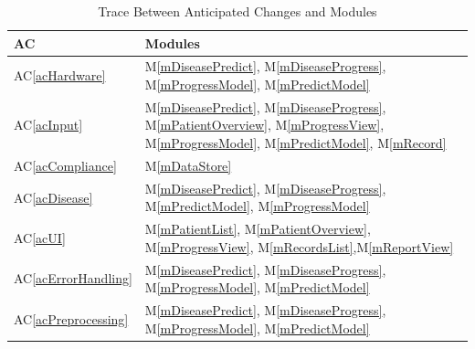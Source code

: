 \documentclass[12pt, titlepage]{article}
\newcommand{\acref}[1]{AC\ref{#1}}
\newcommand{\mref}[1]{M\ref{#1}}
\begin{document}
\begin{table}[H]
\centering
\begin{tabular}{p{} p{}}
\toprule
\textbf{AC} & \textbf{Modules}\\
\midrule
\acref{acHardware} & \mref{mDiseasePredict}, \mref{mDiseaseProgress}, \mref{mProgressModel}, \mref{mPredictModel}\\
\acref{acInput} & \mref{mDiseasePredict}, \mref{mDiseaseProgress}, \mref{mPatientOverview}, \mref{mProgressView}, \mref{mProgressModel}, \mref{mPredictModel}, \mref{mRecord}\\
\acref{acCompliance} & \mref{mDataStore}\\
\acref{acDisease} & \mref{mDiseasePredict}, \mref{mDiseaseProgress}, \mref{mPredictModel}, \mref{mProgressModel}\\
\acref{acUI} & \mref{mPatientList}, \mref{mPatientOverview}, \mref{mProgressView}, \mref{mRecordsList},\mref{mReportView}\\
\acref{acErrorHandling} & \mref{mDiseasePredict}, \mref{mDiseaseProgress}, \mref{mProgressModel}, \mref{mPredictModel}\\
\acref{acPreprocessing} & \mref{mDiseasePredict}, \mref{mDiseaseProgress}, \mref{mProgressModel}, \mref{mPredictModel}\\
\bottomrule
\end{tabular}
\caption{Trace Between Anticipated Changes and Modules}
\label{TblACT}
\end{table}
\end{document}

